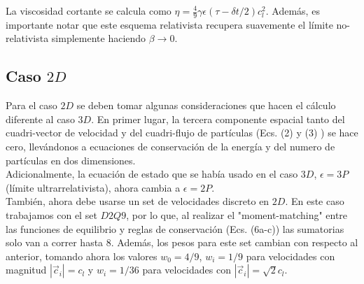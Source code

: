 \documentclass{article}
\begin{document}
 La viscosidad cortante se calcula como $\eta = \frac{4}{9} \gamma \epsilon (\tau-\delta t /2) c_l^2$. Además, es importante notar que este esquema relativista recupera suavemente el límite no-relativista simplemente haciendo $\beta \rightarrow 0$.

\subsection{Caso $2D$}
Para el caso $2D$ se deben tomar algunas consideraciones que hacen el cálculo diferente al caso $3D$. En primer lugar, la tercera componente espacial tanto del cuadri-vector de velocidad y del cuadri-flujo de partículas (Ecs. (2) y (3) ) se hace cero, llevándonos a ecuaciones de conservación de la energía y del numero de partículas en dos dimensiones.\\

Adicionalmente, la ecuación de estado que se había usado en el caso $3D$, $\epsilon =3P$ (límite ultrarrelativista), ahora cambia a $\epsilon =2P$.\\

También, ahora debe usarse un set de velocidades discreto en $2D$. En este caso trabajamos con el set $D2Q9$, por lo que, al realizar el "moment-matching" entre las funciones de equilibrio y reglas de conservación (Ecs. (6a-c)) las sumatorias solo van a correr hasta $8$. Además, los pesos para este set cambian con respecto al anterior, tomando ahora los valores $w_0=4/9$, $w_i=1/9$ para velocidades con magnitud $|\vec{c}_i|=c_l$ y $w_i = 1/36$ para velocidades con $|\vec{c}_i|=\sqrt{2}c_l$.\\
\end{document}
